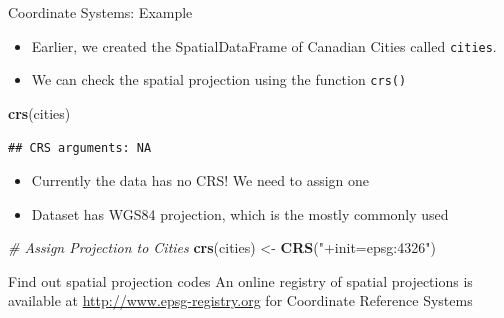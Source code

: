 \documentclass[10pt,ignorenonframetext,]{beamer}
\newenvironment{Shaded}{\begin{snugshade}}{\end{snugshade}}
\newcommand{\KeywordTok}[1]{\textcolor[rgb]{0.13,0.29,0.53}{\textbf{{#1}}}}
\newcommand{\StringTok}[1]{\textcolor[rgb]{0.31,0.60,0.02}{{#1}}}
\newcommand{\CommentTok}[1]{\textcolor[rgb]{0.56,0.35,0.01}{\textit{{#1}}}}
\newcommand{\NormalTok}[1]{{#1}}
\providecommand{\tightlist}{%
  \setlength{\itemsep}{0pt}\setlength{\parskip}{0pt}}
\begin{document}
\begin{frame}[fragile]{Coordinate Systems: Example}

\begin{itemize}
\tightlist
\item
  Earlier, we created the SpatialDataFrame of Canadian Cities called
  \texttt{cities}.
\item
  We can check the spatial projection using the function \texttt{crs()}
\end{itemize}

\begin{Shaded}
\begin{Highlighting}[]
\KeywordTok{crs}\NormalTok{(cities)}
\end{Highlighting}
\end{Shaded}

\begin{verbatim}
## CRS arguments: NA
\end{verbatim}

\begin{itemize}
\tightlist
\item
  Currently the data has no CRS! We need to assign one
\item
  Dataset has WGS84 projection, which is the mostly commonly used
\end{itemize}

\begin{Shaded}
\begin{Highlighting}[]
\CommentTok{# Assign Projection to Cities}
\KeywordTok{crs}\NormalTok{(cities) <-}\StringTok{ }\KeywordTok{CRS}\NormalTok{(}\StringTok{"+init=epsg:4326"}\NormalTok{)}
\end{Highlighting}
\end{Shaded}

\begin{alertblock}{Find out spatial projection codes}
An online registry of spatial projections is available at \url{http://www.epsg-registry.org} for Coordinate Reference Systems
\end{alertblock}

\end{frame}
\end{document}
